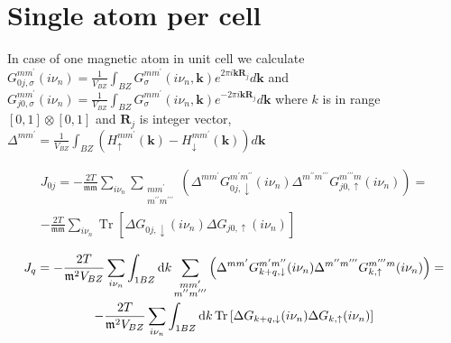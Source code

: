 \documentclass[12pt,a4paper]{article}
\begin{document}
\section{Single atom per cell} %
\label{sub:1}
In case of one magnetic atom in unit cell we calculate 
$    G_{0 j, \sigma}^{m m^{\prime}}(i \nu_n)= \frac{1}{V_{BZ}} \int_{B Z} G_{\sigma}^{m m^{\prime}}(i \nu_n, \mathbf{k}) e^{2 \pi i \mathbf{k} \mathbf{R}_{j}} d \mathbf{k}$ 
and $G_{ j 0, \sigma}^{m m^{\prime}}(i \nu_n)= \frac{1}{V_{BZ}} \int_{B Z} G_{\sigma}^{m m^{\prime}}(i \nu_n, \mathbf{k}) e^{-2 \pi i \mathbf{k} \mathbf{R}_{j}} d \mathbf{k}$
where $k$ is in range $[0, 1] \otimes [0, 1]$ and $\mathbf{R}_j$ is integer vector, $\Delta^{m m^{\prime}} = \frac{1}{V_{BZ}} \int_{B Z}\left(H_{ \uparrow}^{m m^{\prime}}(\mathbf{k})-H_{ \downarrow}^{m m^{\prime}}(\mathbf{k})\right) d \mathbf{k}$

\begin{multline*}
    J_{0 j}= -\frac{2T}{{\mathfrak m} {\mathfrak m}}  \sum_{i \nu_n} \sum_{\substack{m m^{\prime} \\ m^{\prime \prime} m^{\prime \prime \prime}}} 
    \left(\Delta^{m m^{\prime}}  G_{0 j, \downarrow}^{m^{\prime} m^{\prime \prime}} (i \nu_n)  \Delta^{m^{\prime \prime} m^{\prime \prime \prime}}   G_{j 0, \uparrow}^{m^{\prime \prime \prime} m} (i \nu_n) \right) =\\
    -\frac{2T}{{\mathfrak m} {\mathfrak m}}   \sum_{i \nu_n} \operatorname{Tr}
    \left[\Delta G_{0 j, \downarrow}(i \nu_n) \Delta G_{j 0, \uparrow}(i \nu_n) \right]
\end{multline*}

\begin{multline*}
    J_{q}=-\frac{2T}{{\mathfrak m}^2  V_{BZ}}  \sum_{i \nu_n} \int_{1 BZ} \mathop{}\!\mathrm{d} k \sum_{\substack{m m^{\prime} \\ m^{\prime \prime} m^{\prime \prime \prime}}}  
    \left(\Delta^{m m^{\prime}}  G_{k + q, \downarrow}^{m^{\prime} m^{\prime \prime}} (i \nu_n)  \Delta^{m^{\prime \prime} m^{\prime \prime \prime}}   G_{k, \uparrow}^{m^{\prime \prime \prime} m} (i \nu_n) \right) = \\
    -\frac{2T}{{\mathfrak m}^2  V_{BZ}}  \sum_{i \nu_n}  \int_{1 BZ} \mathop{}\!\mathrm{d} k \operatorname{Tr}
    \left[\Delta G_{k+ q, \downarrow}(i \nu_n) \Delta G_{k, \uparrow}(i \nu_n) \right]
\end{multline*}
\end{document}
